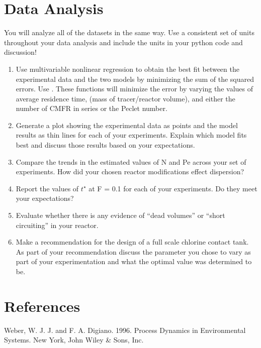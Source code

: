 \documentclass[letterpaper,10pt,english]{sphinxmanual}
\begin{document}
\section{Data Analysis}
\label{\detokenize{Reactor_Characteristics/Reactor_Characteristics:data-analysis}}\label{\detokenize{Reactor_Characteristics/Reactor_Characteristics:heading-reactor-data-analysis}}
You will analyze all of the datasets in the same way. Use a consistent set of units throughout your data analysis and include the units in your python code and discussion!
\begin{enumerate}
\item {} 
Use multivariable nonlinear regression to obtain the best fit between the experimental data and the two models by minimizing the sum of the squared errors. Use . These functions will minimize the error by varying the values of average residence time, (mass of tracer/reactor volume), and either the number of CMFR in series or the Peclet number.

\item {} 
Generate a plot showing the experimental data as points and the model results as thin lines for each of your experiments. Explain which model fits best and discuss those results based on your expectations.

\item {} 
Compare the trends in the estimated values of N and Pe across your set of experiments. How did your chosen reactor modifications effect dispersion?

\item {} 
Report the values of \(t^{\star}\) at F = 0.1 for each of your experiments. Do they meet your expectations?

\item {} 
Evaluate whether there is any evidence of “dead volumes” or “short circuiting” in your reactor.

\item {} 
Make a recommendation for the design of a full scale chlorine contact tank. As part of your recommendation discuss the parameter you chose to vary as part of your experimentation and what the optimal value was determined to be.

\end{enumerate}


\section{References}
\label{\detokenize{Reactor_Characteristics/Reactor_Characteristics:references}}\label{\detokenize{Reactor_Characteristics/Reactor_Characteristics:heading-reactor-references}}
Weber, W. J. J. and F. A. Digiano. 1996. Process Dynamics in Environmental Systems. New York, John Wiley \& Sons, Inc.
\end{document}
